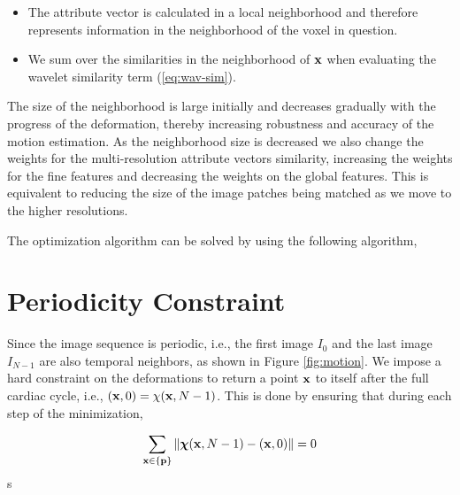 \begin{itemize}
	\item The attribute vector is calculated in a local neighborhood and therefore represents information in the neighborhood of the voxel in question.
	\item We sum over the similarities in the neighborhood of $\mathbf{x}$ when evaluating the wavelet similarity term (\ref{eq:wav-sim}).
\end{itemize}

The size of the neighborhood is large initially and decreases gradually with the progress of the deformation, thereby increasing robustness and accuracy of the motion estimation. As the neighborhood size is decreased we also change the weights for the multi-resolution attribute vectors similarity, increasing the weights for the fine features and decreasing the weights on the global features. This is equivalent to reducing the size of the image patches being matched as we move to the higher resolutions.

The optimization algorithm can be solved by using the following algorithm,



\section {Periodicity Constraint}
Since the image sequence is periodic, i.e.,  the first image $I_0$ and the last image $I_{N-1}$ are also temporal neighbors, as shown in Figure \ref{fig:motion}. We impose a hard constraint on the deformations to return a point $\mathbf{x}$ to itself after the full cardiac cycle, i.e., $( \mathbf{x}, 0 ) = \chi ( \mathbf{x}, N-1 )$. This is done by ensuring that during each step of the minimization,

\begin{equation}
\sum_{\mathbf{x} \in \{ \mathbf{p} \}} \| {\boldsymbol{\chi}} ( \mathbf{x}, N-1 ) - ( \mathbf{x}, 0 ) \| = 0 
\end{equation}s
